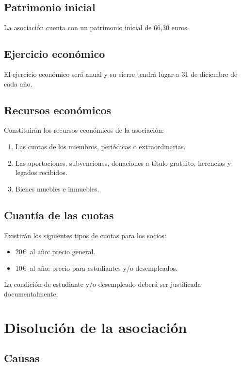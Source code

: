 \documentclass[a4paper, 12pt, oneside]{book}
\begin{document}
\section{Patrimonio inicial}

La asociación cuenta con un patrimonio inicial de 66,30 euros.

\section{Ejercicio económico}

El ejercicio económico será anual y su cierre tendrá lugar a 31 de diciembre de cada año.

\section{Recursos económicos}

Constituirán los recursos económicos de la asociación:

\begin{enumerate}
    \item Las cuotas de los miembros, periódicas o extraordinarias.  
    \item Las aportaciones, subvenciones, donaciones a título gratuito, herencias y legados recibidos.  
    \item Bienes muebles e inmuebles.
\end{enumerate}

\section{Cuantía de las cuotas}

Existirán los siguientes tipos de cuotas para los socios:

\begin{itemize}
    \item 20\euro\ al año: precio general.
    \item 10\euro\ al año: precio para estudiantes y/o desempleados.
\end{itemize}

La condición de estudiante y/o desempleado deberá ser justificada documentalmente.

\chapter{Disolución de la asociación}

\section{Causas}
\end{document}
